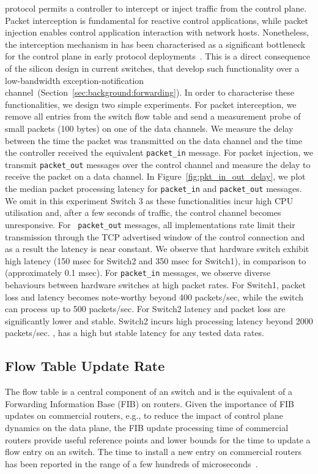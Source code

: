 \of protocol permits a controller to intercept or inject traffic from the
control plane. Packet interception is fundamental for reactive control applications, while
packet injection enables control application interaction with network hosts.
Nonetheless, the interception mechanism in \of has been characterised as a
significant bottleneck for the control plane in early \of protocol
deployments~\cite{Kobayashi:vn}. This is a direct consequence of the silicon
design in current \of switches, that develop such functionality over a
low-bandwidth exception-notification
channel~(Section~\ref{sec:background:forwarding}). In order to characterise these
functionalities, we design two simple experiments. For packet interception, we
remove all entries from the switch flow table and send a measurement probe of
small packets (100 bytes) on one of the data channels. We measure the delay
between the time the packet was transmitted on the data channel and the time the
controller received the equivalent {\tt packet\_in} message. For packet
injection, we transmit {\tt packet\_out} messages over the control channel and
measure the delay to receive the packet on a data channel. In
Figure~\ref{fig:pkt_in_out_delay}, we plot the median packet processing latency
for {\tt packet\_in} and {\tt packet\_out} messages. We omit in this experiment
Switch 3 as these functionalities incur high CPU utilisation and, after a few
seconds of traffic, the control channel becomes unresponsive. For {\tt
  packet\_out} messages, all implementations rate limit their transmission
through the TCP advertised window of the control connection and as a result the
latency is near constant. We observe that hardware switch exhibit high latency
(150 msec for Switch2 and 350 msec for Switch1), in comparison to \ovs
(approximately 0.1 msec).  For {\tt packet\_in} messages, we observe diverse
behaviours between hardware switches at high packet rates. For Switch1, packet
loss and latency becomes note-worthy beyond 400 packets/sec, while the switch
can process up to 500 packets/sec. For Switch2 latency and packet loss are
significantly lower and stable. Switch2 incurs high processing latency beyond
2000 packets/sec.  \ovs, has a high but stable latency for any tested
data rates. 

\subsection{Flow Table Update Rate}\label{sec:results-rate}

The flow table is a central component of an \of switch and is the
equivalent of a Forwarding Information Base (FIB) on routers. Given the
importance of FIB updates on commercial routers, e.g., to reduce the impact of
control plane dynamics on the data plane, the FIB update processing time of
commercial routers provide useful reference points and lower bounds for the time
to update a flow entry on an \of switch. The time to install a new entry on
commercial routers has been reported in the range of a few hundreds of
microseconds~\cite{shaikh-igp}.

